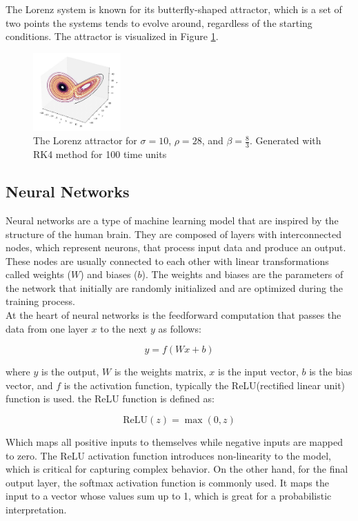 \documentclass[11pt]{article}
\begin{document}
The Lorenz system is known for its butterfly-shaped attractor, which is a set of two points the systems tends to evolve around, regardless of the starting conditions. The attractor is visualized in Figure \ref{fig:lorenz_attractor}.

\begin{figure}[h]
\centering
\includegraphics[width=0.3\textwidth]{lorenz_attractor.jpeg}
\caption{The Lorenz attractor for $\sigma = 10$, $\rho = 28$, and $\beta = \frac{8}{3}$. Generated with RK4 method for 100 time units}
\label{fig:lorenz_attractor}
\end{figure}

\subsection{Neural Networks}

Neural networks are a type of machine learning model that are inspired by the structure of the human brain. They are composed of layers with interconnected nodes, which represent neurons, that process input data and produce an output. These nodes are usually connected to each other with linear transformations called weights (\(W\)) and biases (\(b\)). The weights and biases are the parameters of the network that initially are randomly initialized and are optimized during the training process. \\

At the heart of neural networks is the feedforward computation that passes the data from one layer \(x\) to the next \(y\) as follows:

\[ y = f(Wx + b) \]

where \(y\) is the output, \(W\) is the weights matrix, \(x\) is the input vector, \(b\) is the bias vector, and \(f\) is the activation function, typically the ReLU(rectified linear unit) function is used. the ReLU function is defined as:

\[ \text{ReLU}(z) = \max(0, z) \]

Which maps all positive inputs to themselves while negative inputs are mapped to zero. The ReLU activation function introduces non-linearity to the model, which is critical for capturing complex behavior. On the other hand, for the final output layer, the softmax activation function is commonly used. It maps the input to a vector whose values sum up to 1, which is great for a probabilistic interpretation.
\end{document}
